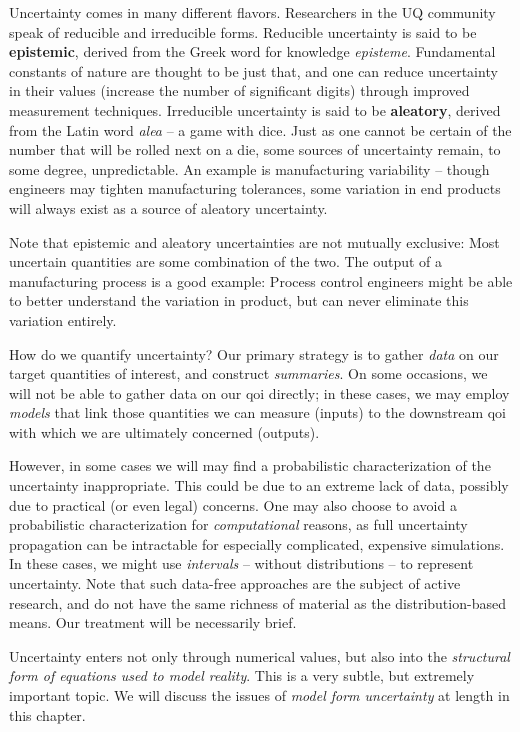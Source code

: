 \documentclass[../primer.tex]{subfiles}
\begin{document}
Uncertainty comes in many different flavors. Researchers in the UQ community
speak of reducible and irreducible forms. Reducible uncertainty is said to be
\textbf{epistemic}, derived from the Greek word for knowledge \emph{episteme}.
Fundamental constants of nature are thought to be just that, and one can reduce
uncertainty in their values (increase the number of significant digits) through
improved measurement techniques. Irreducible uncertainty is said to be
\textbf{aleatory}, derived from the Latin word \emph{alea} -- a game with dice.
Just as one cannot be certain of the number that will be rolled next on a die,
some sources of uncertainty remain, to some degree, unpredictable. An example is
manufacturing variability -- though engineers may tighten manufacturing
tolerances, some variation in end products will always exist as a source of
aleatory uncertainty.

Note that epistemic and aleatory uncertainties are not mutually exclusive: Most
uncertain quantities are some combination of the two. The output of a
manufacturing process is a good example: Process control engineers might be able
to better understand the variation in product, but can never eliminate this
variation entirely.

How do we quantify uncertainty? Our primary strategy is to gather \emph{data} on
our target quantities of interest, and construct \emph{summaries}. On some
occasions, we will not be able to gather data on our qoi directly; in these
cases, we may employ \emph{models} that link those quantities we can measure
(inputs) to the downstream qoi with which we are ultimately concerned (outputs).

However, in some cases we will may find a probabilistic characterization of the
uncertainty inappropriate. This could be due to an extreme lack of data,
possibly due to practical (or even legal) concerns. One may also choose to avoid
a probabilistic characterization for \emph{computational} reasons, as full
uncertainty propagation can be intractable for especially complicated, expensive
simulations. In these cases, we might use \emph{intervals} -- without
distributions -- to represent uncertainty. Note that such data-free approaches
are the subject of active research, and do not have the same richness of
material as the distribution-based means. Our treatment will be necessarily
brief.

Uncertainty enters not only through numerical values, but also into the
\emph{structural form of equations used to model reality}. This is a very
subtle, but extremely important topic. We will discuss the issues of \emph{model
  form uncertainty} at length in this chapter.
\end{document}

